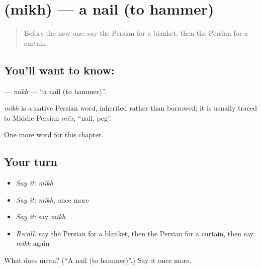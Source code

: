 \section[\texorpdfstring{\fa{میخ} (mikh)}{میخ (mikh)}]{ (mikh) — a nail (to hammer)}

\label{lesson:FA-C93-mikh}



\begin{quote}
Before the new one: say the Persian for a blanket, then the Persian for a curtain.
\end{quote}

\subsection*{You'll want to know: }
\textbf{} — \emph{mikh} — \textquotedblleft{}a nail (to hammer)\textquotedblright{}.

\begin{cousinweb}
\emph{mikh} is a native Persian word, inherited rather than borrowed; it is usually traced to Middle Persian \emph{mēx}, \textquotedblleft{}nail, peg\textquotedblright{}.
\end{cousinweb}

\begin{grammarlens}[title={What you've built}]
One more word for this chapter.
\end{grammarlens}

\subsection*{Your turn}
\begin{itemize}
\raggedright
  \item \emph{Say it:} \emph{mikh}
  \item \emph{Say it:} \emph{mikh}, once more
  \item \emph{Say it:} say \emph{mikh}
  \item \emph{Recall:} say the Persian for a blanket, then the Persian for a curtain, then say \emph{mikh} again
\end{itemize}

\begin{tcolorbox}[breakable,colback=teal!4,colframe=teal!35!black,title={Before you move on}]
What does  mean? (\textquotedblleft{}A nail (to hammer)\textquotedblright{}.) Say it once more.
\end{tcolorbox}
